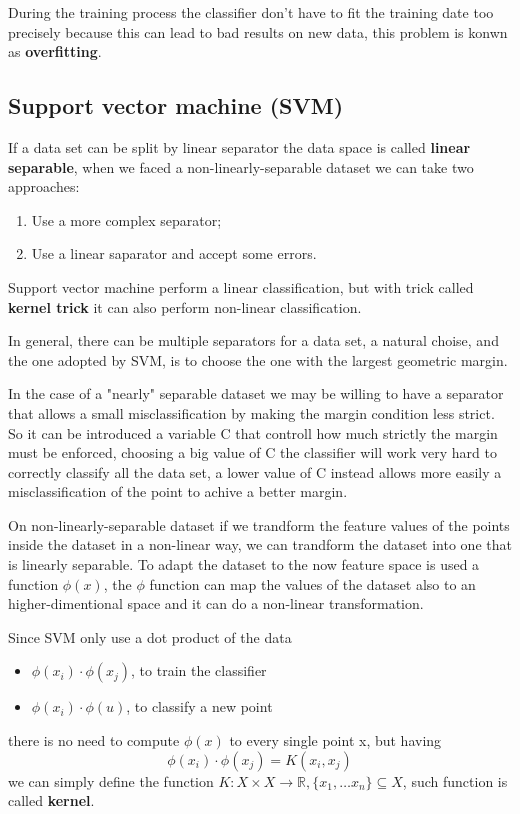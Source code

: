 \documentclass[12pt]{article}
\begin{document}
During the training process the classifier don't have to fit the training date 
too precisely because this can lead to bad results on new data, this problem is konwn
as \textbf{overfitting}. 

\subsection{Support vector machine (SVM)}

If a data set can be split by linear separator the data space is called
\textbf{linear separable}, when we faced a non-linearly-separable dataset we can take
two approaches:
\begin{enumerate}
    \item Use a more complex separator;
    \item Use a linear saparator and accept some errors.
\end{enumerate}

Support vector machine perform a linear classification, but with trick called 
\textbf{kernel trick} it can also perform non-linear classification.

In general, there can be multiple separators for a data set, a natural choise, and
the one adopted by SVM, is to choose the one with the largest geometric margin.

In the case of a "nearly" separable dataset we may be willing to have a separator
that allows a small misclassification by making the margin condition less strict.
So it can be introduced a variable C that controll how much strictly the margin 
must be enforced, choosing a big value of C the classifier will work very hard
to correctly classify
all the data set, a lower value of C instead allows more easily a 
misclassification of the point to achive a better margin.

On non-linearly-separable dataset if we trandform the feature values of the points
inside the dataset in a non-linear way, we can trandform the dataset into one that
is linearly separable. To adapt the dataset to the now feature space is used a
function $\phi(x)$, the $\phi$ function can map the values of the dataset also to 
an higher-dimentional space and it can do a non-linear transformation.

Since SVM only use a dot product of the data
\begin{itemize}
    \item $\phi(x_i) \cdot \phi(x_j)$, to train the classifier
    \item $\phi(x_i) \cdot \phi(u)$, to classify a new point
\end{itemize}
there is no need to compute $\phi(x)$ to every single point x, but having
$$
    \phi(x_i) \cdot \phi(x_j)  = K(x_i, x_j)
$$
we can simply define the function 
$K : X \times X \to\mathbb{R}, \{x_1,\dots x_n\} \subseteq X$, such function is 
called \textbf{kernel}.
\end{document}
